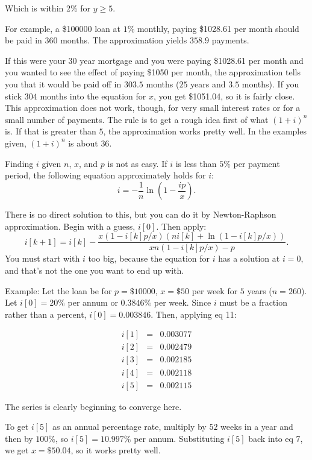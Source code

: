 Which is within 2\% for $y \geq 5$.

For example, a \$100000 loan at $1\%$ monthly, paying \$1028.61 per
month should be paid in $360$ months.  The approximation yields $358.9$
payments.

If this were your $30$ year mortgage and you were paying \$1028.61 per
month and you wanted to see the effect of paying \$1050 per month, the
approximation tells you that it would be paid off in $303.5$ months
($25$ years and $3.5$ months).  If you stick $304$ months into the
equation for $x$, you get \$1051.04, so it is fairly close.  This
approximation does not work, though, for very small interest rates or
for a small number of payments.  The rule is to get a rough idea first
of what $(1 + i)^n$ is.  If that is greater than $5$, the approximation
works pretty well.  In the examples given, $(1 + i)^n$ is about $36$.

Finding $i$ given $n$, $x$, and $p$ is not as easy.  If $i$ is less than
$5\%$ per payment period, the following equation approximately holds for
$i$:
\[
i = -\frac{1}{n} \ln\left(1 - \frac{ip}{x}\right).
\]

There is no direct solution to this, but you can do it by Newton-Raphson
approximation.  Begin with a guess, $i[0]$.  Then apply:
\[
i[k+1] = i[k] -\frac{x(1 - i[k]p/x) (ni[k] + \ln(1 - i[k]p/x))} {xn(1 -
  i[k]p/x) - p}.
\]
You must start with $i$ too big, because the equation for $i$ has a
solution at $i=0$, and that's not the one you want to end up with.

Example: Let the loan be for $p=\$10000$, $x=\$50$ per week for $5$
years ($n=260$).  Let $i[0] = 20\%$ per annum or $0.3846\%$ per week.
Since $i$ must be a fraction rather than a percent, $i[0] = 0.003846$.
Then, applying eq 11:

\begin{eqnarray*}
  i[1] &=& 0.003077\\
  i[2] &=& 0.002479\\
  i[3] &=& 0.002185\\
  i[4] &=& 0.002118\\
  i[5] &=& 0.002115
\end{eqnarray*}

The series is clearly beginning to converge here.

To get $i[5]$ as an annual percentage rate, multiply by $52$ weeks in a
year and then by $100\%$, so $i[5] = 10.997$\% per annum.  Substituting
$i[5]$ back into eq 7, we get $x = \$50.04$, so it works pretty well.

\Ref

